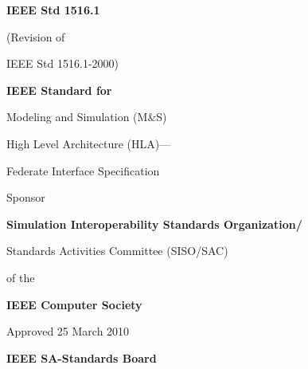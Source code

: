 \thispagestyle{empty}
\begingroup
\sffamily

\begin{flushright}
    {\bfseries\fontsize{11.2}{13.2}\selectfont IEEE Std 1516.1\par}
    {\fontsize{8.5}{10.0}\selectfont (Revision of\par IEEE Std 1516.1-2000)\par}
\end{flushright}

\vspace{1.70in}
{\bfseries\fontsize{22}{25.5}\selectfont
IEEE Standard for\par
Modeling and Simulation (M\&S)\par
High Level Architecture (HLA)---\par
Federate Interface Specification\par}

\vspace{0.72in}
{\fontsize{10.5}{12.2}\selectfont Sponsor\par}
\vspace{5pt}
{\bfseries\fontsize{10.5}{12.2}\selectfont
Simulation Interoperability Standards Organization/\par
Standards Activities Committee (SISO/SAC)\par}
of the\par
{\bfseries IEEE Computer Society\par}

\vspace{0.36in}
{\fontsize{10.5}{12.2}\selectfont Approved 25 March 2010\par}
\vspace{5pt}
{\bfseries IEEE SA-Standards Board\par}

\endgroup
\clearpage
